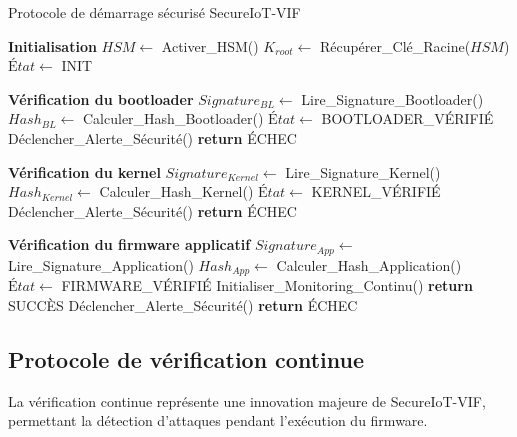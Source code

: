 \begin{algorithm}
\caption{Protocole de démarrage sécurisé SecureIoT-VIF}
\label{alg:secure-boot}
\begin{algorithmic}[1]
\State \textbf{Initialisation}
\State $HSM \leftarrow$ Activer\_HSM()
\State $K_{root} \leftarrow$ Récupérer\_Clé\_Racine($HSM$)
\State $État \leftarrow$ INIT

\State \textbf{Vérification du bootloader}
\State $Signature_{BL} \leftarrow$ Lire\_Signature\_Bootloader()
\State $Hash_{BL} \leftarrow$ Calculer\_Hash\_Bootloader()
    \State $État \leftarrow$ BOOTLOADER\_VÉRIFIÉ
\Else
    \State Déclencher\_Alerte\_Sécurité()
    \State \textbf{return} ÉCHEC
\EndIf

\State \textbf{Vérification du kernel}
\State $Signature_{Kernel} \leftarrow$ Lire\_Signature\_Kernel()
\State $Hash_{Kernel} \leftarrow$ Calculer\_Hash\_Kernel()
    \State $État \leftarrow$ KERNEL\_VÉRIFIÉ
\Else
    \State Déclencher\_Alerte\_Sécurité()
    \State \textbf{return} ÉCHEC
\EndIf

\State \textbf{Vérification du firmware applicatif}
\State $Signature_{App} \leftarrow$ Lire\_Signature\_Application()
\State $Hash_{App} \leftarrow$ Calculer\_Hash\_Application()
    \State $État \leftarrow$ FIRMWARE\_VÉRIFIÉ
    \State Initialiser\_Monitoring\_Continu()
    \State \textbf{return} SUCCÈS
\Else
    \State Déclencher\_Alerte\_Sécurité()
    \State \textbf{return} ÉCHEC
\EndIf
\end{algorithmic}
\end{algorithm}

\subsection{Protocole de vérification continue}

La vérification continue représente une innovation majeure de SecureIoT-VIF, permettant la détection d'attaques pendant l'exécution du firmware.

